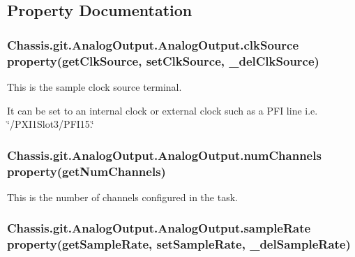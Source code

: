 \subsection{Property Documentation}
\hypertarget{class_chassis_8git_1_1_analog_output_1_1_analog_output_a37ac13275c8e900e56d9209f585463d7}{
\subsubsection[{clk\-Source}]{\setlength{\rightskip}{0pt plus 5cm}Chassis.\-git.\-Analog\-Output.\-Analog\-Output.\-clk\-Source property({\bf get\-Clk\-Source}, {\bf set\-Clk\-Source}, \-\_\-del\-Clk\-Source)\hspace{0.3cm}{\ttfamily [static]}}}\label{class_chassis_8git_1_1_analog_output_1_1_analog_output_a37ac13275c8e900e56d9209f585463d7}


This is the sample clock source terminal. 

It can be set to an internal clock or external clock such as a P\-F\-I line i.\-e. \char`\"{}/\-P\-X\-I1\-Slot3/\-P\-F\-I15.\char`\"{} \hypertarget{class_chassis_8git_1_1_analog_output_1_1_analog_output_a3de173dc3a4ea7afe4e12c95e4a99269}{
\subsubsection[{num\-Channels}]{\setlength{\rightskip}{0pt plus 5cm}Chassis.\-git.\-Analog\-Output.\-Analog\-Output.\-num\-Channels property({\bf get\-Num\-Channels})\hspace{0.3cm}{\ttfamily [static]}}}\label{class_chassis_8git_1_1_analog_output_1_1_analog_output_a3de173dc3a4ea7afe4e12c95e4a99269}


This is the number of channels configured in the task. 

\hypertarget{class_chassis_8git_1_1_analog_output_1_1_analog_output_ad2431ae041aef61c1bd11893a074d0a7}{
\subsubsection[{sample\-Rate}]{\setlength{\rightskip}{0pt plus 5cm}Chassis.\-git.\-Analog\-Output.\-Analog\-Output.\-sample\-Rate property({\bf get\-Sample\-Rate}, {\bf set\-Sample\-Rate}, \-\_\-del\-Sample\-Rate)\hspace{0.3cm}{\ttfamily [static]}}}\label{class_chassis_8git_1_1_analog_output_1_1_analog_output_ad2431ae041aef61c1bd11893a074d0a7}



